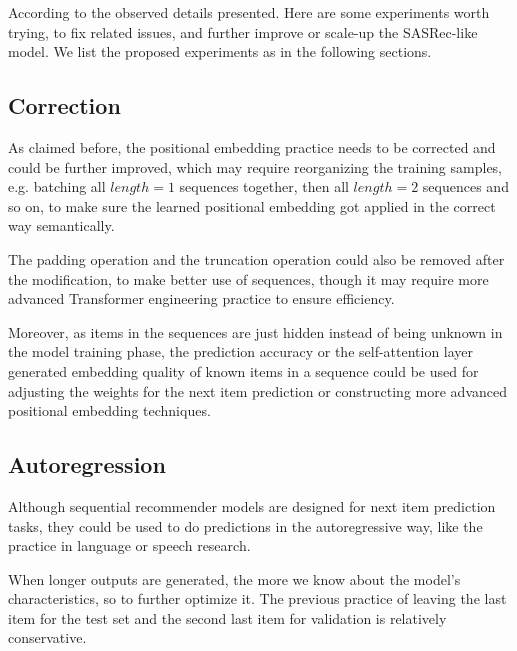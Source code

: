 \documentclass{article}
\begin{document}
According to the observed details presented.
Here are some experiments worth trying,
to fix related issues,
and further improve or scale-up the SASRec-like model.
We list the proposed experiments as in the following sections.

\subsection{Correction}

As claimed before, the positional embedding practice needs to be corrected and could be further improved,
which may require reorganizing the training samples,
e.g. batching all $length=1$ sequences together,
then all $length=2$ sequences and so on,
to make sure the learned positional embedding
got applied in the correct way semantically.

The padding operation and the truncation operation
could also be removed after the modification,
to make better use of sequences,
though it may require more advanced
Transformer engineering practice to ensure efficiency.

Moreover, as items in the sequences are just hidden instead of being unknown in the model training phase,
the prediction accuracy or the self-attention layer generated embedding quality
of known items in a sequence could be used
for adjusting the weights for the next item prediction or constructing more advanced positional embedding techniques.



\subsection{Autoregression}

Although sequential recommender models are designed for next item prediction tasks,
they could be used to do predictions in the autoregressive way,
like the practice in language or speech research.

When longer outputs are generated,
the more we know about the model's characteristics,
so to further optimize it.
The previous practice of leaving the last item for the test set and the second last item for validation is relatively conservative.
\end{document}
